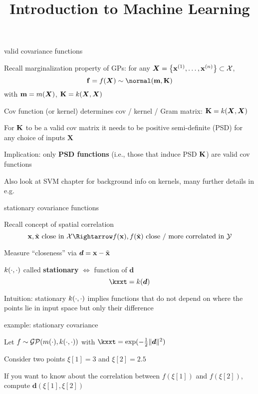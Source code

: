 \documentclass[11pt,compress,t,notes=noshow, xcolor=table]{beamer}
\title{Introduction to Machine Learning}
\begin{document}

\begin{framei}[sep=L]{valid covariance functions}
\item Recall marginalization property of GPs: for any $\bm{X} = \left\{ \mathbf{x}^{(1)}, \ldots, \mathbf{x}^{(n)}\right\} \subset \mathcal{X}$,
$$\fv = \fX \sim \Nmk$$
with $\mathbf{m} = m(\bm{X})$, $\mathbf{K} = k(\bm{X}, \bm{X})$
\item Cov function (or kernel) determines cov / kernel / Gram matrix: $\mathbf{K} = k(\bm{X}, \bm{X})$
\item For $\mathbf{K}$ to be a valid cov matrix it needs to be positive semi-definite (PSD) for any choice of inputs $\bm{X}$
\item Implication: only \textbf{PSD functions} (i.e., those that induce PSD $\mathbf{K}$) are valid cov functions 

\item Also look at SVM chapter for background info on kernels, 
many further details in e.g. 

\end{framei}

\begin{framei}[sep=L]{stationary covariance functions}
\item Recall concept of spatial correlation
$$\xv, \xtil \text{ close in } \Xspace \Rightarrow \fx, f(\xtil) \text{ close / more correlated in } \Yspace$$
\item Measure ``closeness'' via $\bm{d} = \mathbf{x} - \tilde{\mathbf{x}}$ 
\item $k(\cdot, \cdot)$ called \textbf{stationary} $\Leftrightarrow$ function of $\bm{d}$ 
$$\kxxt = k(\bm{d})$$
\item Intuition: stationary $k(\cdot, \cdot)$ implies functions that do not depend on where the points lie in input space but only their difference 

\end{framei}

\begin{framei}{example: stationary covariance}
\item Let $f \sim \mathcal{GP}(m(\cdot), k(\cdot, \cdot))$ with $\kxxt = \exp(-\tfrac{1}{2}\|\bm{d}\|^2)$
\item Consider two points $\xi[1] = 3$ and $\xi[2] = 2.5$
\item If you want to know about the correlation between $f(\xi[1])$ and $f(\xi[2])$, compute $\bm{d}(\xi[1], \xi[2])$
\vfill
{}
\end{framei}
\end{document}
